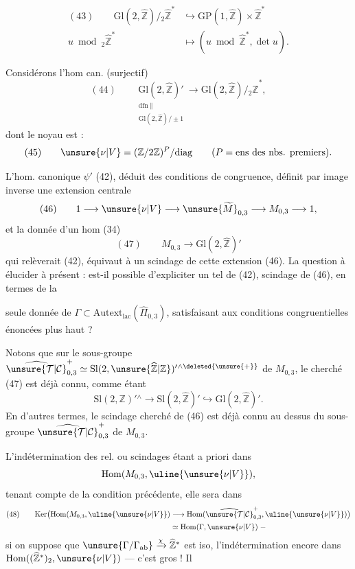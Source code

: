 
\[
\begin{aligned}
(43)\qquad
\mathrm{Gl}(2,\widehat{\mathbb Z})/{}_{2}\widehat{\mathbb Z}^{*}
&\hookrightarrow \mathrm{GP}(1,\widehat{\mathbb Z})\times\widehat{\mathbb Z}^{*}\\
u\bmod {}_{2}\widehat{\mathbb Z}^{*}
&\longmapsto (u\bmod\widehat{\mathbb Z}^{*},\det u).
\end{aligned}
\]

Considérons l'hom can. (surjectif)
\[
(44)\qquad
\underset{\substack{\mathrm{dfn}\;\Vert\\
\mathrm{Gl}(2,\widehat{\mathbb Z})/\pm1}}
{\mathrm{Gl}(2,\widehat{\mathbb Z})'}
\longrightarrow \mathrm{Gl}(2,\widehat{\mathbb Z})/{}_{2}\widehat{\mathbb Z}^{*},
\]
dont le noyau est  :
\[
(45)\qquad
\unsure{\nu|V}=(\mathbb Z/2\mathbb Z)^P/\mathrm{diag}
\qquad (P=\text{ens des nbs. premiers}).
\]

L'hom. canonique $\psi'$ (42), déduit des conditions de congruence,
définit par image inverse une extension centrale
\[
(46)\qquad
1\longrightarrow\unsure{\nu|V}\longrightarrow
\unsure{\widetilde{M}}_{0,3}\longrightarrow
M_{0,3}\longrightarrow1,
\]
et la donnée d'un hom (34)
\[
(47)\qquad
M_{0,3}\longrightarrow\mathrm{Gl}(2,\widehat{\mathbb Z})'
\]
qui relèverait (42), équivaut à un
scindage de cette extension (46). La question à élucider à présent :
est-il possible d'expliciter un tel  de
(42),  scindage de (46), en termes de la


seule donnée de $\Gamma\subset\mathrm{Autext}_{\mathrm{lac}}
(\widehat{\Pi}_{0,3})$, satisfaisant aux conditions congruentielles
énoncées plus haut ?

Notons que sur le sous-groupe
$\widehat{\unsure{\mathcal T|\mathcal C}}_{0,3}^{+}
\simeq \mathrm{Sl}(2,\unsure{\widehat{\mathbb Z}|\mathbb Z})'{}^{\wedge\deleted{\unsure{+}}}$
de $M_{0,3}$, le 
cherché (47) est déjà connu, comme étant
\[
\mathrm{Sl}(2,\mathbb Z)'{}^{\wedge}\longrightarrow
\mathrm{Sl}(2,\widehat{\mathbb Z})'\hookrightarrow
\mathrm{Gl}(2,\widehat{\mathbb Z})'.
\]
En d'autres termes, le scindage cherché de (46) est déjà connu au dessus
du sous-groupe $\widehat{\unsure{\mathcal T|\mathcal C}}_{0,3}^{+}$
de $M_{0,3}$.

L'indétermination des rel. ou scindages étant a priori dans
\[
\mathrm{Hom}(M_{0,3},\uline{\unsure{\nu|V}}),
\]
tenant compte de la condition précédente, elle sera dans
\[
\begin{aligned}
(48)\qquad
\mathrm{Ker}\bigl(\mathrm{Hom}(M_{0,3},\uline{\unsure{\nu|V}})
&\longrightarrow
\mathrm{Hom}(\widehat{\unsure{\mathcal T|\mathcal C}}_{0,3}^{+},
\uline{\unsure{\nu|V}})\bigr)\\
&\simeq\mathrm{Hom}(\Gamma,\unsure{\nu|V})\;-
\end{aligned}
\]
si on suppose que
$\unsure{\Gamma/\Gamma_{\mathrm{ab}}}\xrightarrow{\chi}\widehat{\mathbb Z}^{*}$
est iso, l'indétermination  encore dans
$\mathrm{Hom}((\widehat{\mathbb Z}^{*})_2,\unsure{\nu|V})$
--- c'est gros ! Il

